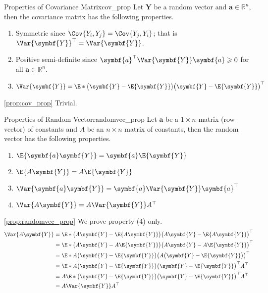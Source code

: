 \begin{Proposition}{Properties of Covariance Matrix}{cov_prop}
    Let $ \symbf{Y} $ be a random vector and $ \symbf{a}\in\mathbb{R}^n $,
    then the covariance matrix has the following properties.
    \begin{enumerate}[label=(\arabic*)]
        \item Symmetric since $ \Cov{Y_i,Y_j}=\Cov{Y_j,Y_i} $; that is $ \Var{\symbf{Y}}^\top=\Var{\symbf{Y}} $.
        \item Positive semi-definite since
              $ \symbf{a}^\top\Var{\symbf{Y}}\symbf{a}\geqslant 0 $
              for all $ \symbf{a}\in\mathbb{R}^n $.
        \item $ \Var{\symbf{Y}}=
                  \E*{\bigl( \symbf{Y}-\E{\symbf{Y}} \bigr)\bigl( \symbf{Y}-\E{\symbf{Y}} \bigr)^\top} $
    \end{enumerate}
\end{Proposition}
\begin{Proof}{\ref{prop:cov_prop}}{}
    Trivial.
\end{Proof}
\begin{Proposition}{Properties of Random Vector}{randomvec_prop}
    Let $ \symbf{a} $ be a $ 1\times n $ matrix (row vector)
    of constants and $ A $ be an $ n\times n $ matrix of constants, then
    the random vector has the following properties.
    \begin{enumerate}[label=(\arabic*)]
        \item $ \E{\symbf{a}\symbf{Y}}=\symbf{a}\E{\symbf{Y}} $
        \item $ \E{A\symbf{Y}}=A\E{\symbf{Y}} $
        \item $ \Var{\symbf{a}\symbf{Y}}=\symbf{a}\Var{\symbf{Y}}\symbf{a}^\top $
        \item $ \Var{A\symbf{Y}}=A\Var{\symbf{Y}}A^\top $
    \end{enumerate}
\end{Proposition}
\begin{Proof}{\ref{prop:randomvec_prop}}{}
    We prove property (4) only.
    \begin{align*}
        \Var{A\symbf{Y}}
         & =\E*{\bigl(A\symbf{Y}-\E{A\symbf{Y}}\bigr)
        \bigl(A\symbf{Y}-\E{A\symbf{Y}}\bigr)^\top}                                                     \\
         & =\E*{\bigl( A\symbf{Y}-A\E{\symbf{Y}} \bigr)
        \bigl( A\symbf{Y}-A\E{\symbf{Y}} \bigr)^\top}                                                   \\
         & =\E*{A\bigl( \symbf{Y}-\E{\symbf{Y}} \bigr)
        \bigl( A\bigl( \symbf{Y}-\E{\symbf{Y}} \bigr) \bigr)^\top}                                      \\
         & =\E*{A\bigl( \symbf{Y}-\E{\symbf{Y}} \bigr)
        \bigl( \symbf{Y}-\E{\symbf{Y}} \bigr)^\top A^\top}                                              \\
         & =A\E*{\bigl( \symbf{Y}-\E{\symbf{Y}} \bigr)\bigl( \symbf{Y}-\E{\symbf{Y}} \bigr)^\top}A^\top \\
         & =A\Var{\symbf{Y}}A^\top
    \end{align*}
\end{Proof}
